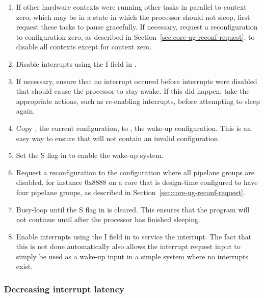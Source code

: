 \begin{enumerate}

\item If other hardware contexts were running other tasks in parallel to
context zero, which may be in a state in which the processor should not sleep,
first request these tasks to pause gracefully. If necessary, request a
reconfiguration to configuration zero, as described in 
Section~\ref{sec:core-ug-reconf-request}. to disable all contexts except for 
context zero.

\item Disable interrupts using the I field in .

\item If necessary, ensure that no interrupt occured before interrupts were
disabled that should cause the processor to stay awake. If this did happen,
take the appropriate actions, such as re-enabling interrupts, before attempting
to sleep again.

\item Copy , the current configuration, to , the wake-up
configuration. This is an easy way to ensure that  will not contain
an invalid configuration.

\item Set the S flag in  to enable the wake-up system.

\item Request a reconfiguration to the configuration where all pipelane groups 
are disabled, for instance 0x8888 on a core that is design-time configured to 
have four pipelane groups, as described in
Section~\ref{sec:core-ug-reconf-request}.

\item Busy-loop until the S flag in  is cleared. This ensures that
the program will not continue until after the processor has finished sleeping.

\item Enable interrupts using the I field in  to service the
interrupt. The fact that this is not done automatically also allows the
interrupt request input to simply be used as a wake-up input in a simple system
where no interrupts exist.

\end{enumerate}

\subsubsection{Decreasing interrupt latency}
\label{sec:core-ug-reconf-saw-latency}

